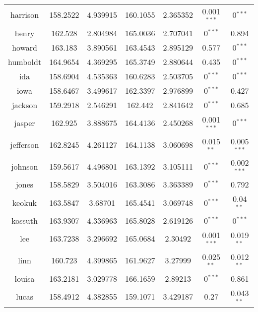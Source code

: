 \begin{table}[]
\begin{tabular}{|c|cc|cc|cc|}
harrison      & 158.2522  & 4.939915          & 160.1055  & 2.365352          & 0.001$^{***}$ & 0$^{***}$     \\
henry         & 162.528   & 2.804984          & 165.0036  & 2.707041          & 0$^{***}$     & 0.894                         \\
howard        & 163.183   & 3.890561          & 163.4543  & 2.895129          & 0.577                         & 0$^{***}$     \\
humboldt      & 164.9654  & 4.369295          & 165.3749  & 2.880644          & 0.435                         & 0$^{***}$     \\
ida           & 158.6904  & 4.535363          & 160.6283  & 2.503705          & 0$^{***}$     & 0$^{***}$     \\
iowa          & 158.6467  & 3.499617          & 162.3397  & 2.976899          & 0$^{***}$     & 0.427                         \\
jackson       & 159.2918  & 2.546291          & 162.442   & 2.841642          & 0$^{***}$     & 0.685                         \\
jasper        & 162.925   & 3.888675          & 164.4136  & 2.450268          & 0.001$^{***}$ & 0$^{***}$     \\
jefferson     & 162.8245  & 4.261127          & 164.1138  & 3.060698          & 0.015$^{**}$  & 0.005$^{***}$ \\
johnson       & 159.5617  & 4.496801          & 163.1392  & 3.105111          & 0$^{***}$     & 0.002$^{***}$ \\
jones         & 158.5829  & 3.504016          & 163.3086  & 3.363389          & 0$^{***}$     & 0.792                         \\
keokuk        & 163.5847  & 3.68701           & 165.4541  & 3.069748          & 0$^{***}$     & 0.04$^{**}$   \\
kossuth       & 163.9307  & 4.336963          & 165.8028  & 2.619126          & 0$^{***}$     & 0$^{***}$     \\
lee           & 163.7238  & 3.296692          & 165.0684  & 2.30492           & 0.001$^{***}$ & 0.019$^{**}$  \\
linn          & 160.723   & 4.399865          & 161.9627  & 3.27999           & 0.025$^{**}$  & 0.012$^{**}$  \\
louisa        & 163.2181  & 3.029778          & 166.1659  & 2.89213           & 0$^{***}$     & 0.861                         \\
lucas         & 158.4912  & 4.382855          & 159.1071  & 3.429187          & 0.27                          & 0.043$^{**}$  \\

\end{tabular}
\end{table}
